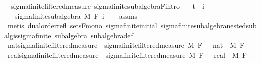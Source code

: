 \begin{isabellebody}
\isanewline
{}\isamarkupfalse%
\ {\isacharparenleft}{\kern0pt}\ sigma{\isacharunderscore}{\kern0pt}finite{\isacharunderscore}{\kern0pt}filtered{\isacharunderscore}{\kern0pt}measure{\isacharparenright}{\kern0pt}\ sigma{\isacharunderscore}{\kern0pt}finite{\isacharunderscore}{\kern0pt}subalgebra{\isacharunderscore}{\kern0pt}F{\isacharbrackleft}{\kern0pt}intro{\isacharbrackright}{\kern0pt}{\isacharcolon}{\kern0pt}\isanewline
\ \ \ {\isachardoublequoteopen}t\ {\isasymle}\ i{\isachardoublequoteclose}\isanewline
\ \ \ {\isachardoublequoteopen}sigma{\isacharunderscore}{\kern0pt}finite{\isacharunderscore}{\kern0pt}subalgebra\ M\ {\isacharparenleft}{\kern0pt}F\ i{\isacharparenright}{\kern0pt}{\isachardoublequoteclose}\isanewline
%
\isadelimproof
\ \ %
\endisadelimproof
%
\isatagproof
{}\isamarkupfalse%
\ assms\ \isamarkupfalse%
\ {\isacharparenleft}{\kern0pt}metis\ dual{\isacharunderscore}{\kern0pt}order{\isachardot}{\kern0pt}refl\ sets{\isacharunderscore}{\kern0pt}F{\isacharunderscore}{\kern0pt}mono\ sigma{\isacharunderscore}{\kern0pt}finite{\isacharunderscore}{\kern0pt}initial\ sigma{\isacharunderscore}{\kern0pt}finite{\isacharunderscore}{\kern0pt}subalgebra{\isachardot}{\kern0pt}nested{\isacharunderscore}{\kern0pt}subalg{\isacharunderscore}{\kern0pt}is{\isacharunderscore}{\kern0pt}sigma{\isacharunderscore}{\kern0pt}finite\ subalgebra\ subalgebra{\isacharunderscore}{\kern0pt}def{\isacharparenright}{\kern0pt}%
\endisatagproof
{\isafoldproof}%
%
\isadelimproof
\isanewline
%
\endisadelimproof
\isanewline
{}\isamarkupfalse%
\ nat{\isacharunderscore}{\kern0pt}sigma{\isacharunderscore}{\kern0pt}finite{\isacharunderscore}{\kern0pt}filtered{\isacharunderscore}{\kern0pt}measure\ {\isacharequal}{\kern0pt}\ sigma{\isacharunderscore}{\kern0pt}finite{\isacharunderscore}{\kern0pt}filtered{\isacharunderscore}{\kern0pt}measure\ M\ F\ {\isachardoublequoteopen}{}\ {\isacharcolon}{\kern0pt}{\isacharcolon}{\kern0pt}\ nat{\isachardoublequoteclose}\ \ M\ F\isanewline
{}\isamarkupfalse%
\ real{\isacharunderscore}{\kern0pt}sigma{\isacharunderscore}{\kern0pt}finite{\isacharunderscore}{\kern0pt}filtered{\isacharunderscore}{\kern0pt}measure\ {\isacharequal}{\kern0pt}\ sigma{\isacharunderscore}{\kern0pt}finite{\isacharunderscore}{\kern0pt}filtered{\isacharunderscore}{\kern0pt}measure\ M\ F\ {\isachardoublequoteopen}{}\ {\isacharcolon}{\kern0pt}{\isacharcolon}{\kern0pt}\ real{\isachardoublequoteclose}\ \ M\ F\isanewline

\end{isabellebody}
